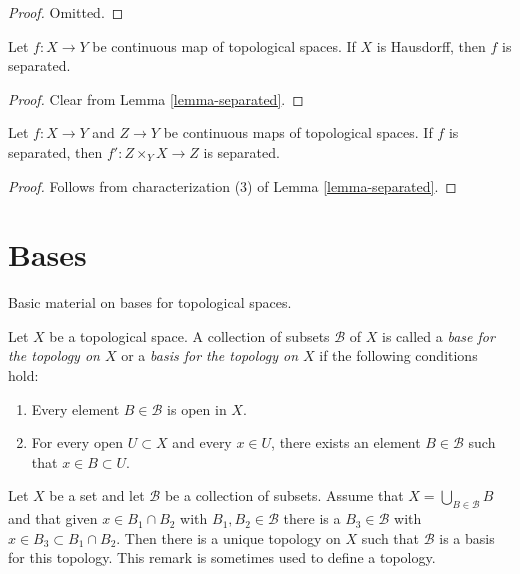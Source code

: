 \begin{proof}
Omitted.
\end{proof}

\begin{lemma}
\label{lemma-from-hausdorff}
Let $f : X \to Y$ be continuous map of topological spaces.
If $X$ is Hausdorff, then $f$ is separated.
\end{lemma}

\begin{proof}
Clear from Lemma \ref{lemma-separated}.
\end{proof}

\begin{lemma}
\label{lemma-base-change-separated}
Let $f : X \to Y$ and $Z \to Y$ be continuous maps of topological spaces.
If $f$ is separated, then $f' : Z \times_Y X \to Z$ is separated.
\end{lemma}

\begin{proof}
Follows from characterization (3) of Lemma \ref{lemma-separated}.
\end{proof}




\section{Bases}
\label{section-bases}

\noindent
Basic material on bases for topological spaces.

\begin{definition}
\label{definition-base}
Let $X$ be a topological space. A collection of subsets $\mathcal{B}$ of $X$
is called a {\it base for the topology on $X$} or a {\it basis for the
topology on $X$} if the following conditions hold:
\begin{enumerate}
\item Every element $B \in \mathcal{B}$ is open in $X$.
\item For every open $U \subset X$ and every $x \in U$,
there exists an element $B \in \mathcal{B}$ such that
$x \in B \subset U$.
\end{enumerate}
\end{definition}

\noindent
Let $X$ be a set and let $\mathcal{B}$ be a collection of subsets.
Assume that $X = \bigcup_{B \in \mathcal{B}} B$ and that given
$x \in B_1 \cap B_2$ with $B_1, B_2 \in \mathcal{B}$ there is a
$B_3 \in \mathcal{B}$ with $x \in B_3 \subset B_1 \cap B_2$.
Then there is a unique topology on $X$ such that $\mathcal{B}$
is a basis for this topology. This remark is sometimes used
to define a topology.

